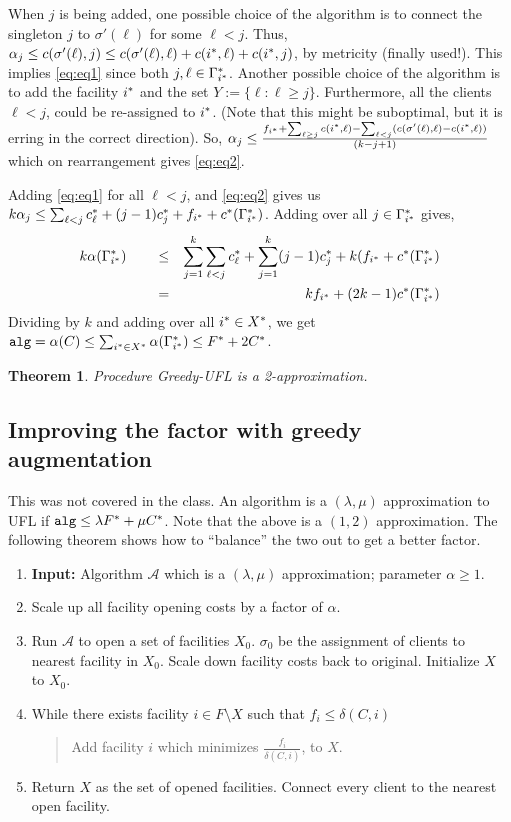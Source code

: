 \documentclass[11pt]{article}
\newtheorem{theorem}{Theorem}
\def\script#1{\mathcal{#1}}
\def\alg{{\tt alg}}
\begin{document}
When $j$ is being added, one possible choice of the algorithm is to connect the singleton $j$ to $\sigma'(\ell)$
for some $\ell < j$. Thus, $\alpha_j \le c(\sigma'(\ell),j) \le c(\sigma'(\ell),\ell) + c({i^*},\ell) + c({i^*},j)$, by metricity (finally used!). This implies \eqref{eq:eq1} since both $j,\ell \in \Gamma^*_{i^*}$.
Another possible choice of the algorithm is to add the facility ${i^*}$ and the set $Y := \{\ell: \ell \ge j\}$.
Furthermore, all the clients $\ell < j$, could be re-assigned to ${i^*}$. (Note that this might be suboptimal, but it is erring in the correct direction). So, $\alpha_j \le \frac{f_{i^*} + \sum_{\ell\ge j} c({i^*},\ell) - \sum_{\ell < j}(c(\sigma'(\ell),\ell) - c({i^*},\ell))}{(k-j+1)}$ which on rearrangement gives \eqref{eq:eq2}. 

Adding \eqref{eq:eq1} for all $\ell < j$, and \eqref{eq:eq2} gives us
$k\alpha_j \le  \sum_{\ell<j} c^*_\ell + (j-1)c^*_j + f_{i^*} + c^*(\Gamma^*_{i^*}) $. Adding over all $j\in \Gamma^*_{i^*}$
gives, 
\begin{align*}
k\alpha(\Gamma^*_{i^*}) &\qquad \le & \sum_{j=1}^k \sum_{\ell < j} c^*_\ell + \sum_{j=1}^k (j-1)c^*_j + k(f_{i^*} + c^*(\Gamma^*_{i^*}) \\
& \qquad = & kf_{i^*} + (2k-1)c^*(\Gamma^*_{i^*})
\end{align*}
\noindent
Dividing by $k$ and adding over all ${i^*}\in X^*$, we get 
$\alg = \alpha(C) \le \sum_{\i\in X^*} \alpha(\Gamma^*_\i) \le F^* + 2C^*$.

\begin{theorem}
Procedure {\sc Greedy-UFL} is a 2-approximation.
\end{theorem}


\subsection{Improving the factor with greedy augmentation }
This was not covered in the class.
An algorithm is a $(\lambda,\mu)$ approximation to UFL if $\alg \le \lambda F^* + \mu C^*$.
Note that the above is a $(1,2)$ approximation. The following theorem shows how to ``balance'' the two out to get a better factor. 

\begin{enumerate}
\item {\bf Input:} Algorithm $\script{A}$ which is a $(\lambda,\mu)$ approximation; parameter $\alpha \ge 1$.
\item Scale up all facility opening costs by a factor of $\alpha$.
\item Run $\script{A}$ to open a set of facilities $X_0$. $\sigma_0$ be the assignment of clients to nearest facility in $X_0$. Scale down facility costs back to original. Initialize $X$ to $X_0$.
\item While there exists facility $i\in F\setminus X$ such that $f_i \le \delta(C,i)$
\begin{quote}Add facility $i$ which minimizes $\frac{f_i}{\delta(C,i)}$, to $X$.\end{quote}
\item Return $X$ as the set of opened facilities. Connect every client to the nearest open facility.
\end{enumerate}
\end{document}
